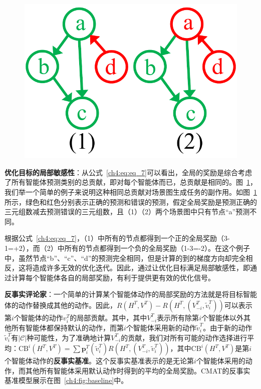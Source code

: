\begin{figure}
    \centering
        \includegraphics[width=0.95\linewidth]{chapter4/res/local_sensitive.pdf}
    \label{ch4:fig:local_sensitive}
\end{figure}

\textbf{优化目标的局部敏感性}：从公式~\eqref{ch4:eq:eq_7}可以看出，全局的奖励是综合考虑了所有智能体预测类别的总贡献，即对每个智能体而已，总贡献是相同的。图~\ref{ch4:fig:local_sensitive}，我们举一个简单的例子来说明这种相同总贡献对场景图生成任务的副作用。如图~\ref{ch4:fig:local_sensitive}所示，绿色和红色分别表示正确的预测和错误的预测，假定全局奖励是预测正确的三元组数减去预测错误的三元组数，且（1）（2）两个场景图中只有节点“a”预测不同。

根据公式~\eqref{ch4:eq:eq_7}，（1）中所有的节点都得到一个正的全局奖励（3-1=+2），而（2）中所有的节点都得到一个负的全局奖励（1-3=-2）。在这个例子中，虽然节点“b”、“c”、“d”的预测完全相同，但是计算的到的梯度方向却完全相反，这将造成许多无效的优化迭代。因此，通过让优化目标满足局部敏感性，即通过计算每个智能体各自的局部奖励，有利于提供更有效的优化信号。


\textbf{反事实评论家}：一个简单的计算某个智能体动作的局部奖励的方法就是将目标智能体的动作替换成其他的动作。因此，$R(H^T, V^T) - R(H^T, (V^T_{-i}, \tilde{v}^T_i))$可以表示第$i$个智能体的动作$v^T_i$的局部贡献。其中，其中$V^T_{-i}$表示所有除第$i$个智能体以外其他所有智能体都保持默认的动作，而第$i$个智能体采用新的动作$\tilde{v}^T_i$。由于新的动作$\tilde{v}^T_i$有$|\mathcal{C}|$种可能性，为了准确地计算$V^T_{-i}$的贡献，我们对所有可能的动作选择进行平均：$ \text{CB}^i(H^T, V^T) = \sum \bm{p}^T_i(\tilde{v}^T_i) R(H^T, (V^T_{-i}, \tilde{v}^T_i))$，其中$\text{CB}^i(H^T, V^T)$是第$i$个智能体动作的\textbf{反事实基准}。这个反事实基准表示的是无论第$i$个智能体采用的动作，而其他所有智能体采用默认动作时得到的平均的全局奖励。CMAT的反事实基准模型展示在图~\ref{ch4:fig:baseline}中。


